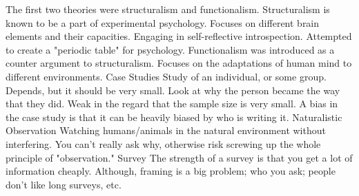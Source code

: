 \markdownRendererUlEndTight \markdownRendererInterblockSeparator
{}\markdownRendererInterblockSeparator
{}\markdownRendererUlBeginTight
\markdownRendererUlItem The first two theories were structuralism and functionalism.\markdownRendererUlItemEnd 
\markdownRendererUlItem Structuralism is known to be a part of experimental psychology.\markdownRendererInterblockSeparator
{}\markdownRendererUlBeginTight
\markdownRendererUlItem Focuses on different brain elements and their capacities.\markdownRendererUlItemEnd 
\markdownRendererUlItem Engaging in self-reflective introspection.\markdownRendererUlItemEnd 
\markdownRendererUlItem Attempted to create a "periodic table" for psychology.\markdownRendererUlItemEnd 
\markdownRendererUlEndTight \markdownRendererUlItemEnd 
\markdownRendererUlItem Functionalism was introduced as a counter argument to structuralism.\markdownRendererInterblockSeparator
{}\markdownRendererUlBeginTight
\markdownRendererUlItem Focuses on the adaptations of human mind to different environments.\markdownRendererUlItemEnd 
\markdownRendererUlEndTight \markdownRendererUlItemEnd 
\markdownRendererUlEndTight \markdownRendererInterblockSeparator
{}\markdownRendererInterblockSeparator
{}\markdownRendererUlBeginTight
\markdownRendererUlItem Case Studies\markdownRendererInterblockSeparator
{}\markdownRendererUlBeginTight
\markdownRendererUlItem Study of an individual, or some group. Depends, but it should be very small.\markdownRendererUlItemEnd 
\markdownRendererUlItem Look at why the person became the way that they did.\markdownRendererUlItemEnd 
\markdownRendererUlItem Weak in the regard that the sample size is very small.\markdownRendererUlItemEnd 
\markdownRendererUlItem A bias in the case study is that it can be heavily biased by who is writing it.\markdownRendererUlItemEnd 
\markdownRendererUlEndTight \markdownRendererUlItemEnd 
\markdownRendererUlItem Naturalistic Observation\markdownRendererInterblockSeparator
{}\markdownRendererUlBeginTight
\markdownRendererUlItem Watching humans/animals in the natural environment without interfering.\markdownRendererUlItemEnd 
\markdownRendererUlItem You can't really ask why, otherwise risk screwing up the whole principle of "observation."\markdownRendererUlItemEnd 
\markdownRendererUlEndTight \markdownRendererUlItemEnd 
\markdownRendererUlItem Survey\markdownRendererInterblockSeparator
{}\markdownRendererUlBeginTight
\markdownRendererUlItem The strength of a survey is that you get a lot of information cheaply. Although, framing is a big problem; who you ask; people don't like long surveys, etc.\markdownRendererUlItemEnd 

